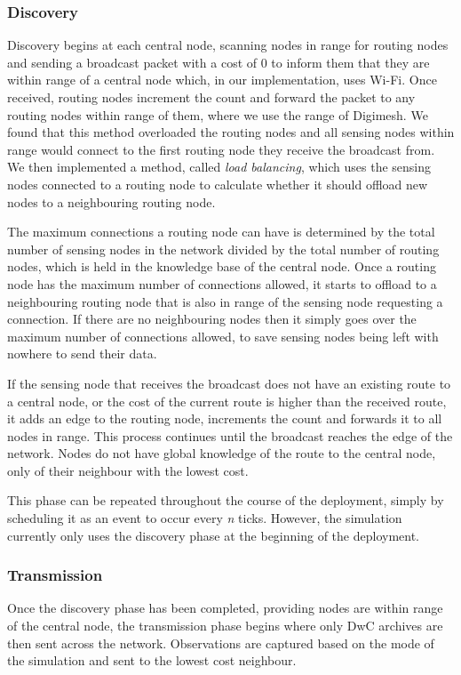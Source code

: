 \subsubsection{Discovery}
	Discovery begins at each central node, scanning nodes in range for routing nodes and sending a broadcast packet with a cost of 0 to inform them that they are within range of a central node which, in our implementation, uses Wi-Fi. Once received, routing nodes increment the count and forward the packet to any routing nodes within range of them, where we use the range of Digimesh. We found that this method overloaded the routing nodes and all sensing nodes within range would connect to the first routing node they receive the broadcast from. We then implemented a method, called \textit{load balancing}, which uses the sensing nodes connected to a routing node to calculate whether it should offload new nodes to a neighbouring routing node.
	
	The maximum connections a routing node can have is determined by the total number of sensing nodes in the network divided by the total number of routing nodes, which is held in the knowledge base of the central node. Once a routing node has the maximum number of connections allowed, it starts to offload to a neighbouring routing node that is also in range of the sensing node requesting a connection. If there are no neighbouring nodes then it simply goes over the maximum number of connections allowed, to save sensing nodes being left with nowhere to send their data.
	
	If the sensing node that receives the broadcast does not have an existing route to a central node, or the cost of the current route is higher than the received route, it adds an edge to the routing node, increments the count and forwards it to all nodes in range. This process continues until the broadcast reaches the edge of the network. Nodes do not have global knowledge of the route to the central node, only of their neighbour with the lowest cost.
	
	This phase can be repeated throughout the course of the deployment, simply by scheduling it as an event to occur every \textit{n} ticks. However, the simulation currently only uses the discovery phase at the beginning of the deployment.
	
\subsubsection{Transmission}
	Once the discovery phase has been completed, providing nodes are within range of the central node, the transmission phase begins where only DwC archives are then sent across the network. Observations are captured based on the mode of the simulation and sent to the lowest cost neighbour.
	

